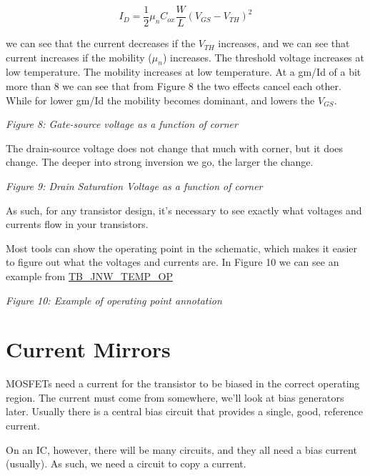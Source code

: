 \[ I_D = \frac{1}{2} \mu_n C_{ox} \frac{W}{L}\left( V_{GS} - V_{TH}\right)^2\]

we can see that the current decreases if the \(V_{TH}\) increases, and
we can see that current increases if the mobility (\(\mu_n\)) increases.
The threshold voltage increases at low temperature. The mobility
increases at low temperature. At a gm/Id of a bit more than 8 we can see
that from Figure 8 the two effects cancel each other. While for lower
gm/Id the mobility becomes dominant, and lowers the \(V_{GS}\).


{
\centering
{}
}

\emph{Figure 8: Gate-source voltage as a function of corner }

The drain-source voltage does not change that much with corner, but it
does change. The deeper into strong inversion we go, the larger the
change.


{
\centering
{}
}

\emph{Figure 9: Drain Saturation Voltage as a function of corner }

As such, for any transistor design, it's necessary to see exactly what
voltages and currents flow in your transistors.

Most tools can show the operating point in the schematic, which makes it
easier to figure out what the voltages and currents are. In Figure 10 we
can see an example from
\href{https://github.com/wulffern/jnw_temp_sky130a/blob/main/design/JNW_TEMP_SKY130A/TB_JNW_TEMP_OP.sch}{TB\_JNW\_TEMP\_OP}


{
\centering
{}
}

\emph{Figure 10: Example of operating point annotation }

\section{Current Mirrors}\label{current-mirrors}

MOSFETs need a current for the transistor to be biased in the correct
operating region. The current must come from somewhere, we'll look at
bias generators later. Usually there is a central bias circuit that
provides a single, good, reference current.

On an IC, however, there will be many circuits, and they all need a bias
current (usually). As such, we need a circuit to copy a current.

